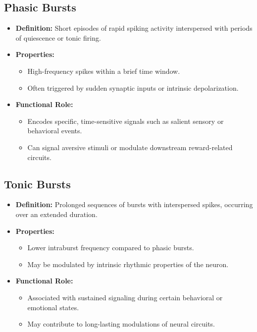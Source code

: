 \documentclass[a4paper,9pt]{extarticle}
\begin{document}
\subsection{Phasic Bursts}
\begin{itemize}
    \item \textbf{Definition:} Short episodes of rapid spiking activity interspersed with periods of quiescence or tonic firing.
    \item \textbf{Properties:}
        \begin{itemize}
            \item High-frequency spikes within a brief time window.
            \item Often triggered by sudden synaptic inputs or intrinsic depolarization.
        \end{itemize}
    \item \textbf{Functional Role:} 
        \begin{itemize}
            \item Encodes specific, time-sensitive signals such as salient sensory or behavioral events.
            \item Can signal aversive stimuli or modulate downstream reward-related circuits.
        \end{itemize}
\end{itemize}

\subsection{Tonic Bursts}
\begin{itemize}
    \item \textbf{Definition:} Prolonged sequences of bursts with interspersed spikes, occurring over an extended duration.
    \item \textbf{Properties:}
        \begin{itemize}
            \item Lower intraburst frequency compared to phasic bursts.
            \item May be modulated by intrinsic rhythmic properties of the neuron.
        \end{itemize}
    \item \textbf{Functional Role:} 
        \begin{itemize}
            \item Associated with sustained signaling during certain behavioral or emotional states.
            \item May contribute to long-lasting modulations of neural circuits.
        \end{itemize}
\end{itemize}
\end{document}
